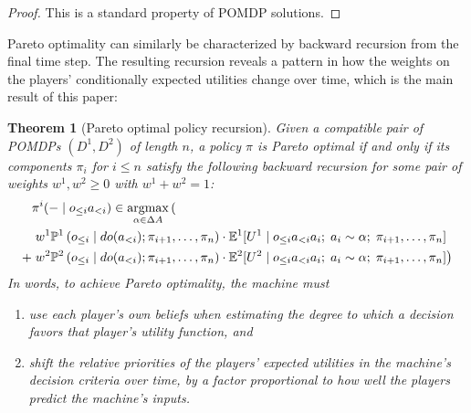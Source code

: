 \documentclass{article}  %
\newcommand{\hist}[1]{o_{\le #1}a_{<#1}}
\newcommand{\dohist}[1]{o_{\le #1} \mid do(a_{<#1})}
\DeclareMathOperator*{\argmax}{argmax}
\newtheorem{theorem}{Theorem}
\begin{document}
\begin{proof}
This is a standard property of POMDP solutions.
\end{proof}

Pareto optimality can similarly be characterized by backward recursion from the final time step.  The resulting recursion reveals a pattern in how the weights on the players' conditionally expected utilities change over time, which is the main result of this paper:

\begin{theorem}[Pareto optimal policy recursion]\label{thm:main}
Given a compatible pair of POMDPs $(D^1,D^2)$ of length $n$, a policy $\pi$ is Pareto optimal if and only if its components $\pi_i$ for $i\le n$ satisfy the following backward recursion for some pair of weights $w^1,w^2\geq 0$ with $w^1+w^2=1$:
\begin{align*}
&\pi^i(-\mid\hist{i}) \in \argmax_{\alpha\in\Delta A} \left(\vphantom{\left(\left(\right)\right)}\right.\\
& \left.w^1 \PP^1\left(\dohist{i}; \pi_{i+1},\ldots,\pi_n\right)\cdot \EE^1[U^1 \mid \hist{i} a_i ;\; a_i\sim \alpha;\; \pi_{i+1},\ldots,\pi_n]\right.\\
+ & \left.w^2 \PP^2\left(\dohist{i}; \pi_{i+1},\ldots,\pi_n\right)\cdot \EE^2[U^2 \mid \hist{i} a_i;\; a_i\sim \alpha;\; \pi_{i+1},\ldots,\pi_n] \right)
\end{align*}
In words, to achieve Pareto optimality, the machine must
\begin{enumerate}
\item use each player's own beliefs when estimating the degree to which a decision favors that player's utility function, and
\item shift the relative priorities of the players' expected utilities in the machine's decision criteria over time, by a factor proportional to how well the players predict the machine's inputs.
\end{enumerate}
\end{theorem}
\end{document}
